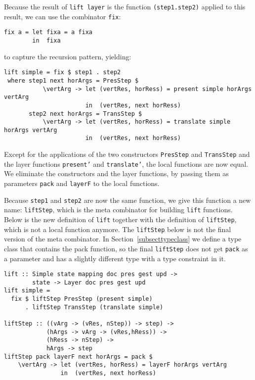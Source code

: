 Because the result of \texttt{lift layer} is the function \texttt{(step1.step2)} applied to this result, we can use the combinator \texttt{fix}:

\begin{small}
\begin{verbatim}
fix a = let fixa = a fixa
        in  fixa
\end{verbatim}
\end{small}

to capture the recursion pattern, yielding:

\begin{small}
\begin{verbatim}
lift simple = fix $ step1 . step2 
 where step1 next horArgs = PresStep $ 
           \vertArg -> let (vertRes, horRess) = present simple horArgs vertArg                                         
                       in  (vertRes, next horRess)
       step2 next horArgs = TransStep $
           \vertArg -> let (vertRes, horRess) = translate simple horArgs vertArg                     
                       in  (vertRes, next horRess)
\end{verbatim}
\end{small}

Except for the applications of the two constructors \texttt{PresStep} and \texttt{TransStep} and the layer functions \texttt{present'} and \texttt{translate'}, the local functions are now equal. We eliminate the constructors and the layer functions, by passing them as parameters \texttt{pack} and \texttt{layerF} to the local functions.

Because \texttt{step1} and \texttt{step2} are now the same function, we give this function a new name: \texttt{liftStep}, which is the meta combinator for building \texttt{lift} functions. Below is the new definition of \texttt{lift} together with the definition of \texttt{liftStep}, which is not a local function anymore. The \texttt{liftStep} below is not the final version of the meta combinator. In Section~\ref{subsecttypeclass} we define a type class that contains the pack function, so the final \texttt{liftStep} does not get \texttt{pack} as a parameter and has a slightly different type with a type constraint in it.

\begin{small}
\begin{verbatim}
lift :: Simple state mapping doc pres gest upd ->
        state -> Layer doc pres gest upd
lift simple = 
  fix $ liftStep PresStep (present simple) 
      . liftStep TransStep (translate simple) 

liftStep :: ((vArg -> (vRes, nStep)) -> step) ->
            (hArgs -> vArg -> (vRes,hRess)) ->
            (hRess -> nStep) ->
            hArgs -> step
liftStep pack layerF next horArgs = pack $
    \vertArg -> let (vertRes, horRess) = layerF horArgs vertArg
                in  (vertRes, next horRess)
\end{verbatim}
\end{small}



